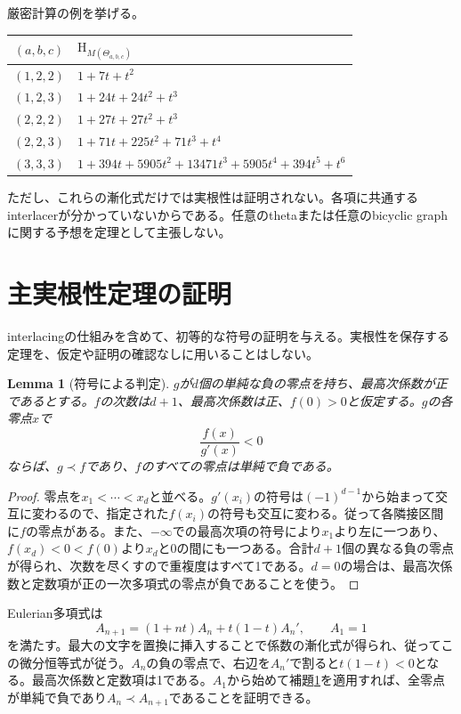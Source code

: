 \documentclass[12pt]{amsart}
\newtheorem{lem}[thm]{Lemma}
\theoremstyle{definition}
\theoremstyle{remark}
\numberwithin{equation}{section}
\newcommand{\HCh}{\mathrm{H}}
\begin{document}
厳密計算の例を挙げる。
\begin{center}\small
\begin{tabular}{c|l}
$(a,b,c)$&$\HCh_{M(\Theta_{a,b,c})}$\\\hline
$(1,2,2)$&$1+7t+t^2$\\
$(1,2,3)$&$1+24t+24t^2+t^3$\\
$(2,2,2)$&$1+27t+27t^2+t^3$\\
$(2,2,3)$&$1+71t+225t^2+71t^3+t^4$\\
$(3,3,3)$&$1+394t+5905t^2+13471t^3+5905t^4+394t^5+t^6$
\end{tabular}
\end{center}
ただし、これらの漸化式だけでは実根性は証明されない。各項に共通するinterlacerが分かっていないからである。任意のthetaまたは任意のbicyclic graphに関する予想を定理として主張しない。

\section{主実根性定理の証明}
interlacingの仕組みを含めて、初等的な符号の証明を与える。実根性を保存する定理を、仮定や証明の確認なしに用いることはしない。

\begin{samepage}
\begin{lem}[符号による判定]\label{ja-sign}
$g$が$d$個の単純な負の零点を持ち、最高次係数が正であるとする。$f$の次数は$d+1$、最高次係数は正、$f(0)>0$と仮定する。$g$の各零点$x$で
\[
 \frac{f(x)}{g'(x)}<0
\]
ならば、$g\prec f$であり、$f$のすべての零点は単純で負である。
\end{lem}
\end{samepage}
\begin{proof}
零点を$x_1<\cdots<x_d$と並べる。$g'(x_i)$の符号は$(-1)^{d-1}$から始まって交互に変わるので、指定された$f(x_i)$の符号も交互に変わる。従って各隣接区間に$f$の零点がある。また、$-\infty$での最高次項の符号により$x_1$より左に一つあり、$f(x_d)<0<f(0)$より$x_d$と0の間にも一つある。合計$d+1$個の異なる負の零点が得られ、次数を尽くすので重複度はすべて1である。$d=0$の場合は、最高次係数と定数項が正の一次多項式の零点が負であることを使う。
\end{proof}

Eulerian多項式は
\begin{equation}\label{ja-euler-recurrence}
 A_{n+1}=(1+nt)A_n+t(1-t)A_n',\qquad A_1=1
\end{equation}
を満たす。最大の文字を置換に挿入することで係数の漸化式が得られ、従ってこの微分恒等式が従う。$A_n$の負の零点で、右辺を$A_n'$で割ると$t(1-t)<0$となる。最高次係数と定数項は1である。$A_1$から始めて補題\ref{ja-sign}を適用すれば、全零点が単純で負であり$A_n\prec A_{n+1}$であることを証明できる。
\end{document}
